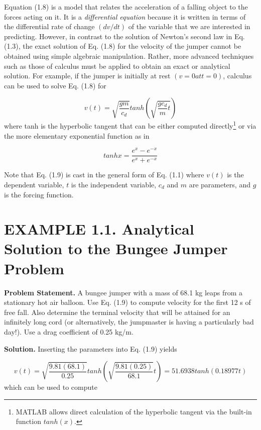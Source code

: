 \documentclass[../main.tex]{subfiles}
\begin{document}
Equation (1.8) is a model that relates the acceleration of a falling object to the forces
acting on it. It is a \textsl{differential equation} because it is written in terms of the differential rate
of change $(dv/dt)$ of the variable that we are interested in predicting. However, in contrast
to the solution of Newton's second law in Eq. (1.3), the exact solution of Eq. (1.8) for the
velocity of the jumper cannot be obtained using simple algebraic manipulation. Rather,
more advanced techniques such as those of calculus must be applied to obtain an exact or
analytical solution. For example, if the jumper is initially at rest $(v = 0 at t = 0)$, calculus
can be used to solve Eq. (1.8) for

\begin{equation}
\tag{1.9}
v(t)=\sqrt{\dfrac{gm}{c_d}}tanh \left(\sqrt{\dfrac{gc_d}{m}t}\right)
\end{equation}
where tanh is the hyperbolic tangent that can be either computed directly\footnote{{}MATLAB allows direct calculation of the hyperbolic tangent via the built-in function $tanh(x)$.} or via the more
elementary exponential function as in

\begin{equation}
\tag{1.10}
tanhx=\dfrac{e^x-e^{-x}}{e^x+e^{-x}}
\end{equation}

Note that Eq. (1.9) is cast in the general form of Eq. (1.1) where $v(t)$ is the dependent
variable, $t$ is the independent variable, $c_d$ and $m$ are parameters, and $g$ is the forcing function.


\bigskip
\section*{EXAMPLE 1.1. Analytical Solution to the Bungee Jumper Problem }
\label{sec:sec3}
\textbf{Problem Statement.} A bungee jumper with a mass of 68.1 kg leaps from a stationary hot
air balloon. Use Eq. (1.9) to compute velocity for the first 12 s of free fall. Also determine
the terminal velocity that will be attained for an infinitely long cord (or alternatively, the
jumpmaster is having a particularly bad day!). Use a drag coefficient of 0.25 kg/m.

\textbf{Solution.} Inserting the parameters into Eq. (1.9) yields

$$ 
v(t) =\sqrt{\dfrac{9.81(68.1)}{0.25}}tanh \left(\sqrt{\dfrac{9.81(0.25)}{68.1}}t\right)= 51.6938 tanh(0.18977t)
$$
\newpage
which can be used to compute
\end{document}
